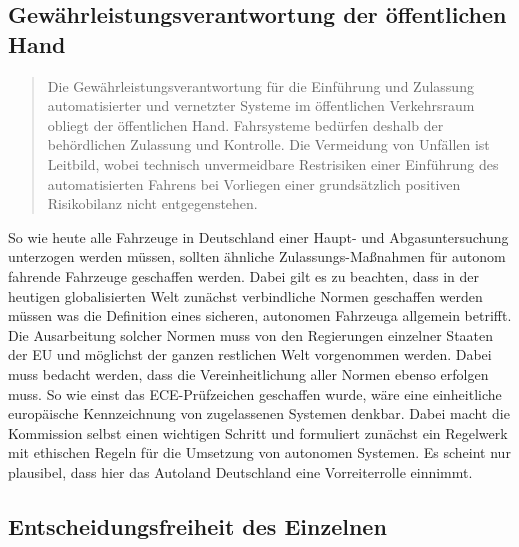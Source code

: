 \documentclass[twoside,a4paper,12pt]{article}
\begin{document}
\subsection{Gewährleistungsverantwortung der öffentlichen Hand} \label{GewaehrleistungsverantwortungDerOeffentlichenHand}

\begin{quote}
\glqq
Die Gewährleistungsverantwortung für die Einführung und Zulassung automatisierter
und vernetzter Systeme im öffentlichen Verkehrsraum obliegt der öffentlichen Hand.
Fahrsysteme bedürfen deshalb der behördlichen Zulassung und Kontrolle. Die Vermeidung von Unfällen ist Leitbild, wobei technisch 
unvermeidbare Restrisiken einer Einführung des automatisierten Fahrens bei Vorliegen einer grundsätzlich positiven Risikobilanz
nicht entgegenstehen.\grqq\mbox{~\cite[S. 10]{ek}}
\end{quote}

So wie heute alle Fahrzeuge in Deutschland einer Haupt- und Abgasuntersuchung unterzogen werden müssen, sollten ähnliche Zulassungs-Maßnahmen für autonom
fahrende Fahrzeuge geschaffen werden. Dabei gilt es zu beachten, dass in der heutigen globalisierten Welt zunächst verbindliche Normen geschaffen werden müssen was  die Definition eines sicheren, autonomen Fahrzeuga allgemein betrifft. Die Ausarbeitung solcher Normen muss von den Regierungen einzelner Staaten der EU und möglichst der ganzen restlichen Welt vorgenommen werden. Dabei muss bedacht werden, dass die Vereinheitlichung aller Normen ebenso erfolgen muss. So wie einst das
ECE-Prüfzeichen geschaffen wurde, wäre eine einheitliche europäische Kennzeichnung von zugelassenen Systemen denkbar. Dabei macht die Kommission selbst einen wichtigen Schritt und formuliert zunächst ein Regelwerk mit ethischen Regeln für die Umsetzung von autonomen Systemen. Es scheint nur plausibel, dass hier das Autoland Deutschland eine Vorreiterrolle einnimmt.\\

\subsection{Entscheidungsfreiheit des Einzelnen} \label{EntscheidungsfreiheitDesEinzelnen}
\end{document}
